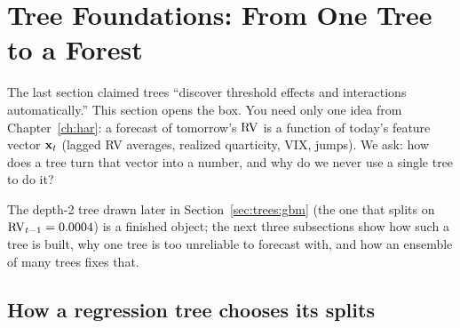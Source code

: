 \section{Tree Foundations: From One Tree to a Forest}\label{sec:trees:foundations}

\begin{prereq}
The last section claimed trees ``discover threshold effects and interactions
automatically.''  This section opens the box.  You need only one idea from
Chapter~\ref{ch:har}: a forecast of tomorrow's $\operatorname{RV}$ is a function of
today's feature vector $\mathbf{x}_t$ (lagged RV averages, realized quarticity,
VIX, jumps).  We ask: how does a tree turn that vector into a number, and
why do we never use a single tree to do it?
\end{prereq}

The depth-2 tree drawn later in Section~\ref{sec:trees:gbm} (the one that
splits on $\operatorname{RV}_{t-1} = 0.0004$) is a finished object; the next three
subsections show how such a tree is built, why one tree is too unreliable to
forecast with, and how an ensemble of many trees fixes that.

\subsection{How a regression tree chooses its splits}

